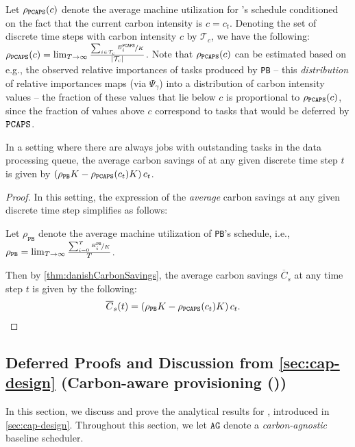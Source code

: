 Let $\rho_{\texttt{PCAPS}}(c)$ denote the average machine utilization for \DANISH's schedule conditioned on the fact that the current carbon intensity is $c = c_t$.  Denoting the set of discrete time steps with carbon intensity $c$ by $\mathcal{T}_c$, we have the following: $\rho_{\texttt{PCAPS}}(c) = \lim_{T\to \infty} \frac{\sum_{i\in\mathcal{T}_c} \nicefrac{E^\texttt{PCAPS}_i}{K}}{\vert \mathcal{T}_c \vert}$.  
Note that $\rho_{\texttt{PCAPS}}(c)$ can be estimated based on e.g., the observed relative importances of tasks produced by \texttt{PB} -- this \textit{distribution} of relative importances maps (via $\Psi_\gamma$) into a distribution of carbon intensity values -- the fraction of these values that lie below $c$ is proportional to $\rho_{\texttt{PCAPS}}(c)$, since the fraction of values above $c$ correspond to tasks that would be deferred by $\texttt{PCAPS}$.

\begin{cor} \label{cor:danishCarbonSavingsContinuous}
In a setting where there are always jobs with outstanding tasks in the data processing queue, the average carbon savings of \DANISH at any given discrete time step $t$ is given by $\left(\rho_{\texttt{PB}} K - \rho_{\texttt{PCAPS}}(c_t) K \right) c_t$.
\end{cor}
\begin{proof}
In this setting, the expression of the \textit{average} carbon savings at any given discrete time step simplifies as follows:

Let $\rho_{\texttt{PB}}$ denote the average machine utilization of \texttt{PB}'s schedule, i.e., $\rho_{\texttt{PB}} = \lim_{T\to \infty} \frac{\sum_{i=0}^T \nicefrac{E^\texttt{PB}_i}{K}}{T}$.

Then by \autoref{thm:danishCarbonSavings}, the average carbon savings $\overline{C}_s$ at  any time step $t$ is given by the following:
\begin{align*}
\overline{C}_s(t) &= \left(\rho_{\texttt{PB}} K - \rho_{\texttt{PCAPS}}(c_t) K \right) c_t.
\end{align*}
\end{proof}

\subsection{Deferred Proofs and Discussion from \autoref{sec:cap-design} (Carbon-aware provisioning (\CAP))} \label{apx:cap-proofs}

In this section, we discuss and prove the analytical results for \CAP, introduced in \autoref{sec:cap-design}.  Throughout this section, we let $\texttt{AG}$ denote a \textit{carbon-agnostic} baseline scheduler.

